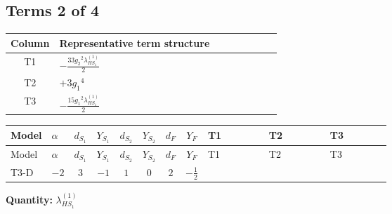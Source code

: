 \documentclass[8pt]{article}
\begin{document}
\begin{landscape}
\subsection*{Terms 2 of 4}
\begin{center}
\begin{tabular}{@{}c >{\raggedright\arraybackslash}p{0.82\linewidth}@{}}
\toprule
Column & Representative term structure \\
\midrule
T1 & \(\displaystyle -\frac{33 {g_2}^2 {\lambda_{HS_1}^{(1)}}}{2}\) \\
\midrule
T2 & \(\displaystyle +3 {g_1}^4\) \\
\midrule
T3 & \(\displaystyle -\frac{15 {g_1}^2 {\lambda_{HS_1}^{(1)}}}{2}\) \\
\midrule
\bottomrule
\end{tabular}
\end{center}
\smallskip
\tiny
\begin{longtable}{@{}llcccccc >{\raggedright\arraybackslash}p{0.21\linewidth} >{\raggedright\arraybackslash}p{0.21\linewidth} >{\raggedright\arraybackslash}p{0.21\linewidth}@{}}
\toprule
Model & $\alpha$ & $d_{S_1}$ & $Y_{S_1}$ & $d_{S_2}$ & $Y_{S_2}$ & $d_F$ & $Y_F$ & T1 & T2 & T3 \\
\midrule
\endfirsthead
\toprule
Model & $\alpha$ & $d_{S_1}$ & $Y_{S_1}$ & $d_{S_2}$ & $Y_{S_2}$ & $d_F$ & $Y_F$ & T1 & T2 & T3 \\
\midrule
\endhead
T3-D & $-2$ & $3$ & $-1$ & $1$ & $0$ & $2$ & $-\frac{1}{2}$ & \scriptsize\adjustbox{max width=\linewidth}{$\begin{gathered} -\frac{33 {g_2}^2 {\lambda_{HS_1}^{(1)}}}{2}\end{gathered}$} & \scriptsize\adjustbox{max width=\linewidth}{$\begin{gathered} +3 {g_1}^4\end{gathered}$} & \scriptsize\adjustbox{max width=\linewidth}{$\begin{gathered} -\frac{15 {g_1}^2 {\lambda_{HS_1}^{(1)}}}{2}\end{gathered}$} \\
\midrule
\bottomrule
\end{longtable}
\clearpage
\noindent\textbf{Quantity: }$\lambda_{HS_1}^{(1)}$\par\smallskip

\end{landscape}
\end{document}
